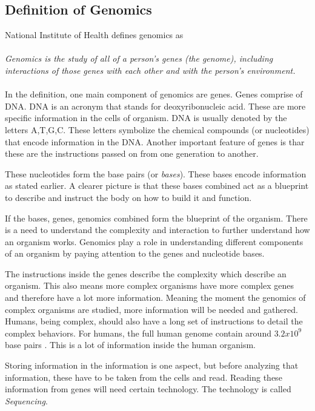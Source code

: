 \documentclass{article}
\begin{document}
\subsection{Definition of Genomics}
National Institute of Health \autocite{genomics-definition} defines genomics as \\ \\
\textit{Genomics is the study of all of a person's genes (the genome), including interactions of those genes with each other and with the person's environment.} \\ \\


In the definition, one main component of genomics are genes. Genes comprise of DNA. DNA is an acronym that stands for deoxyribonucleic acid. These are more specific information in the cells of organism. DNA is usually denoted by the letters A,T,G,C. These letters symbolize the chemical compounds (or nucleotides) that encode information in the DNA. Another important feature of genes is thar these  are the instructions passed on from one generation to another. \autocite[p.~2]{hartl2018}


These nucleotides form the base pairs (or \textit{bases}). These bases encode information as stated earlier. A clearer picture is that these bases combined act as a blueprint to describe and instruct the body on how to build it and function.\autocite{alberts_mole}

If the bases, genes, genomics combined form the blueprint of the organism. There is a need to understand the complexity and interaction to further understand how an organism works. Genomics play a role in understanding different components of an organism by paying attention to the genes and nucleotide bases. 

The instructions inside the genes describe the complexity which describe an organism. This also means more complex organisms have more complex genes and therefore have a lot more information. Meaning the moment the genomics of complex organisms are studied, more information will be needed and gathered. Humans, being complex, should also have a long set of instructions to detail the complex behaviors. For humans, the full human genome contain around $3.2x10^9$ base pairs \autocite{introgenomics}. This is a lot of information inside the human organism. 

Storing information in the information is one aspect, but before analyzing that information, these have to be taken from the cells and read. Reading these information from genes will need certain technology. The technology is called \textit{Sequencing}.
\end{document}
